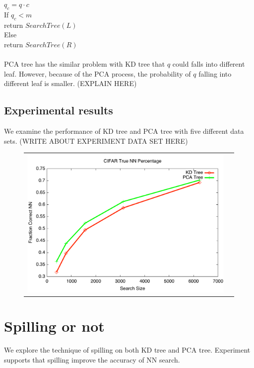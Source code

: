 \documentclass[paper=letter, fontsize=12pt]{article} %
\begin{document}
\hspace*{2em} $q_c = q \cdot c$\\
\hspace*{2em} If $q_c < m$\\
\hspace*{3em} return $SearchTree(L)$\\
\hspace*{2em} Else\\
\hspace*{3em} return $SearchTree(R)$
\\~\\
PCA tree has the similar problem with KD tree that $q$ could falls into different leaf. However, because of the PCA process, the probability of $q$ falling into different leaf is smaller. (EXPLAIN HERE)


\subsection{Experimental results}

We examine the performance of KD tree and PCA tree with five different data sets. (WRITE ABOUT EXPERIMENT DATA SET HERE)

\begin{figure}[h]
   \centering
   \begin{tabular}{c c}
   	\includegraphics[width=.5\textwidth]{kd_vs_pca.pdf}
   \end{tabular}
\end{figure}

\section{Spilling or not}
We explore the technique of spilling on both KD tree and PCA tree.  Experiment supports that spilling improve the accuracy of NN search.
\end{document}
